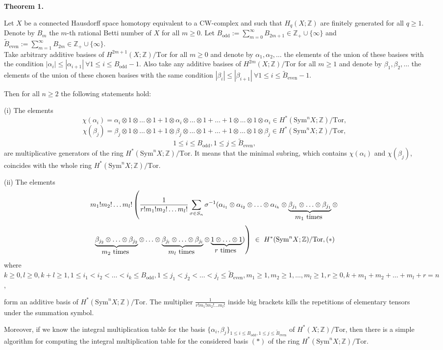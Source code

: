 \documentclass[a4paper,14pt]{article}
\newcommand{\Sym}{\mathrm{Sym}}
\newcommand{\Tor}{\mathrm{Tor}}
\newcommand{\odd}{\mathrm{odd}}
\newcommand{\even}{\mathrm{even}}
\newcommand{\Z}{\mathbb{Z}}
\begin{document}
\textbf{Theorem 1.} { \it{Let $X$ be a connected Hausdorff space homotopy equivalent to a CW-complex and such that $H_q(X;\Z)$ are finitely generated for all $q\ge 1$.  Denote by $B_m$ the $m$-th rational Betti number of $X$ for all $m\ge 0$. Let $B_{\odd}:=\sum_{m=0}^{\infty} B_{2m+1} \in \Z_{+}\cup \{ \infty \}$ and  $\tilde{B}_{\even}:=\sum_{m=1}^{\infty} B_{2m} \in \Z_{+}\cup \{ \infty \}$. \\
\noindent Take arbitrary additive basises of $H^{2m+1}(X;\Z)/\Tor$ for all $m\ge 0$ and denote by $\alpha_1, \alpha_2,\ldots$ the elements of the union of these basises with the condition $|\alpha_i|\le |\alpha_{i+1}| \ \forall 1\le i \le B_{\odd} - 1$. Also take any additive basises of $H^{2m}(X;\Z)/\Tor$ for all $m\ge 1$ and denote by $\beta_1,\beta_2,\ldots$ the elements of the union of these chosen basises with the same condition $|\beta_i|\le |\beta_{i+1}| \ \forall 1\le i \le \tilde{B}_{\even} - 1$.

\noindent Then for all $n\ge 2$ the following statements hold:

(i) The elements 
$$
\chi(\alpha_i)=\alpha_i\otimes 1\otimes\ldots\otimes 1 + 1\otimes\alpha_i\otimes\ldots\otimes 1 +\ldots + 1\otimes\ldots\otimes 1\otimes\alpha_i \in H^*(\Sym^n X;\Z)/\Tor, 
$$
$$
\chi(\beta_j)=\beta_j\otimes 1\otimes\ldots\otimes 1 + 1\otimes\beta_j\otimes\ldots\otimes 1 +\ldots + 1\otimes\ldots\otimes 1\otimes\beta_j \in H^*(\Sym^n X;\Z)/\Tor, 
$$
$$
1\le i\le B_{\odd}, 1\le j\le \tilde{B}_{\even},
$$
are multiplicative generators of the ring $H^*(\Sym^n X;\Z)/\Tor$. It means that the minimal subring, which contains $\chi(\alpha_i)$ and $\chi(\beta_j)$, coincides with the whole ring $H^*(\Sym^n X;\Z)/\Tor$.

(ii) The elements 
$$
m_1!m_2!\ldots m_l!   \left(   \frac{1}{r! m_1! m_2! \ldots m_l!}   \sum_{  \sigma\in S_n  } \sigma^{-1}(\alpha_{i_1}\otimes \alpha_{i_2}\otimes \ldots \otimes  \alpha_{i_k} \otimes \underbrace{\beta_{j_1} \otimes \ldots \otimes \beta_{j_1}}_{ \mbox{$m_1$ \text{times} } } \otimes \right. 
$$
$$
\left. \underbrace{\beta_{j_2} \otimes \ldots \otimes \beta_{j_2}}_{\mbox{$m_2$ \text{times} } } \otimes \ldots  \otimes \underbrace{ \beta_{j_l} \otimes \ldots \otimes \beta_{j_l} }_{ \mbox{$m_l$ \text{times} } }\otimes \underbrace{  1\otimes \ldots \otimes 1 }_{\mbox{$r$ \text{times} }}   ) \right) \  \in \  H^*(\Sym^n X;\Z)/\Tor, \eqno{(*)} 
$$
where $k\ge 0, l\ge 0, k+l\ge 1, 1\le  i_1<i_2<\ldots <i_k \le B_{\odd}, 1\le j_1<j_2<\ldots <j_l \le \tilde{B}_{\even}, m_1\ge 1,m_2\ge 1,\ldots, m_l\ge 1,  r\ge 0, k+m_1+m_2+\ldots + m_l + r = n$,

\noindent form an additive basis of $H^*(\Sym^n X;\Z)/\Tor$. The multiplier $\frac{1}{r! m_1! m_2! \ldots m_l!}$ inside big brackets kills the repetitions of elementary tensors under the summation symbol.

Moreover, if we know the integral multiplication table for the basis $\{ \alpha_i,\beta_j \}_{1 \le i\le B_{\odd}, 1\le j \le \tilde{B}_{\even}}$ of $H^*(X;\Z)/\Tor$, then there is a simple algorithm for computing the integral multiplication table for the considered basis $(*)$ of the ring $H^*(\Sym^n X;\Z)/\Tor$. } }
\end{document}

